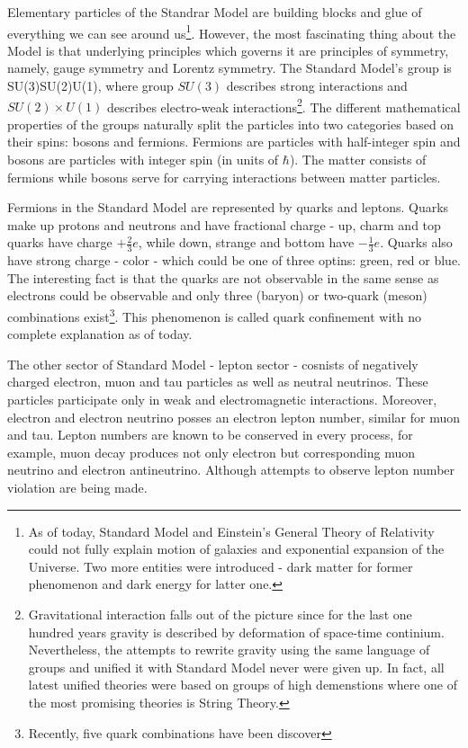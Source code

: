 Elementary particles of the Standrar Model are building blocks and glue of everything we
can see around us\footnote{As of today, Standard Model and Einstein's General Theory of 
Relativity could not fully explain motion of galaxies and exponential expansion of the Universe. 
Two more entities were introduced - dark matter for former phenomenon and dark energy 
for latter one.}. However, the most fascinating thing about the Model is that underlying 
principles which governs it are principles of symmetry, namely, gauge symmetry and Lorentz 
symmetry. The Standard Model's group is 
\be
SU(3)\times SU(2)\times U(1),
\ee 
where group $SU(3)$ describes strong interactions and $SU(2)\times U(1)$ describes 
electro-weak interactions\footnote{Gravitational interaction falls out of the picture
since for the last one hundred years gravity is described by deformation of space-time 
continium. Nevertheless, the attempts to rewrite gravity using the same language of groups
and unified it with Standard Model never were given up. In fact, all latest unified theories 
were based on groups of high demenstions where one of the most promising theories is 
String Theory.}. The different mathematical properties of the groups naturally split
the particles into two categories based on their spins: bosons and fermions. Fermions are 
particles with half-integer spin and bosons are particles with integer spin (in units of $\hbar$). 
The matter consists of fermions while bosons serve for carrying interactions between matter particles.

Fermions in the Standard Model are represented by quarks and leptons. Quarks make up protons
and neutrons and have fractional charge - up, charm and top quarks have charge $+\frac{2}{3}e$, 
while down, strange and bottom have $-\frac{1}{3}e$. Quarks also have strong charge - color -
which could be one of three optins: green, red or blue. The interesting fact is that the quarks
are not observable in the same sense as electrons could be observable and only three (baryon) or 
two-quark (meson) combinations exist\footnote{Recently, five quark combinations have been discover}. 
This phenomenon is called quark confinement with no complete explanation as of today. 

The other sector of Standard Model - lepton sector - cosnists of negatively charged electron,
muon and tau particles as well as neutral neutrinos. These particles participate only in
weak and electromagnetic interactions. Moreover, electron and electron neutrino posses an electron 
lepton number, similar for muon and tau. Lepton numbers are known to be conserved in every process,
for example, muon decay produces not only electron but corresponding muon neutrino and 
electron antineutrino. Although attempts to observe lepton number violation are being made.

